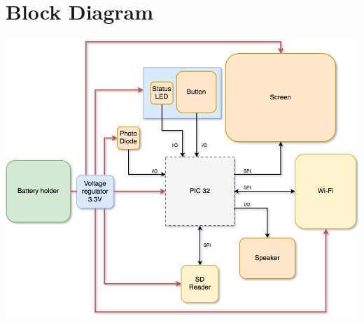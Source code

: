 \documentclass[12pt,a4paper,landscape]{article}
\begin{document}
\section*{Block Diagram}
	\includegraphics[width=19cm]{block-diagram.png}

\newpage
{}
\end{document}
